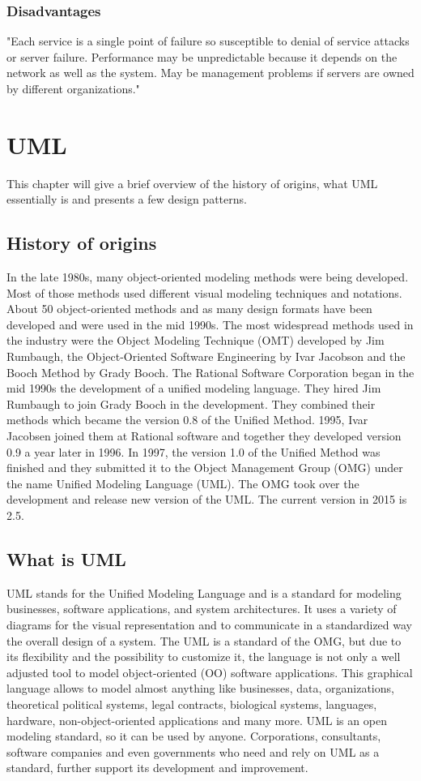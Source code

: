 \subsubsection{Disadvantages}
"Each service is a single point of failure so susceptible to denial of service attacks or server failure. Performance may be unpredictable because it depends on the network as well as the system. May be management problems if servers are owned by different organizations."\citep{sommerville}

\pagebreak
\section{UML}
This chapter will give a brief overview of the history of origins, what UML essentially is and presents a few design patterns. 
\subsection{History of origins}
In the late 1980s, many object-oriented modeling methods were being developed. Most of those methods used different visual modeling techniques and notations. About 50 object-oriented methods and as many design formats have been developed and were used in the mid 1990s. The most widespread methods used in the industry were the Object Modeling Technique (OMT) developed by Jim Rumbaugh, the Object-Oriented Software Engineering by Ivar Jacobson and the Booch Method by Grady Booch. 
The Rational Software Corporation began in the mid 1990s the development of a unified modeling language. They hired Jim Rumbaugh to join Grady Booch in the development. They combined their methods which became the version 0.8 of the Unified Method. 1995, Ivar Jacobsen joined them at Rational software and together they developed version 0.9 a year later in 1996.  In 1997, the version 1.0 of the Unified Method was finished and they submitted it to the Object Management Group (OMG) under the name Unified Modeling Language (UML). The OMG took over the development and release new version of the UML. The current version in 2015 is 2.5.
\subsection{What is UML}
UML stands for the Unified Modeling Language and is a standard for modeling businesses, software applications, and system architectures. It uses a variety of diagrams for the visual representation and to communicate in a standardized way the overall design of a system. The UML is a standard of the OMG, but due to its flexibility and the possibility to customize it, the language is not only a well adjusted tool to model object-oriented (OO) software applications. This graphical language allows to model almost anything like businesses, data, organizations, theoretical political systems, legal contracts, biological systems, languages, hardware, non-object-oriented applications and many more. 
UML is an open modeling standard, so it can be used by anyone. Corporations, consultants, software companies and even governments who need and rely on UML as a standard, further support its development and improvement. 

